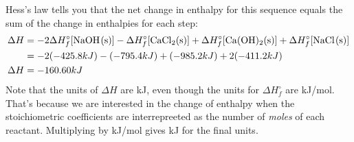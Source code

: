 \documentclass{article}  %
\begin{document}
Hess's law tells you that the net change in enthalpy for this sequence equals the sum of the change in enthalpies for each step:
\begin{equation*}
    \begin{aligned}
        \Delta H &= -2\Delta H^\circ_f [\ce{NaOH_(s)}]  -\Delta H^\circ_f [\ce{CaCl2_(s)}] +  \Delta H^\circ_f [\ce{Ca(OH)2_(s)}] + \Delta H^\circ_f [\ce{NaCl_(s)}] \\
        &= -2(-425.8 kJ) - (-795.4 kJ) + (-985.2 kJ) + 2(-411.2 kJ) \\
        \Delta H &= -160.60 kJ 
    \end{aligned}
\end{equation*}
Note that the units of $\Delta H$ are kJ, even though the units for $\Delta H^\circ_f$ are kJ/mol. That's because we are interested in the change of enthalpy when the stoichiometric coefficients are interrepreeted as the number of \emph{moles} of each reactant. Multiplying by kJ/mol gives kJ for the final units. 
\end{document}
